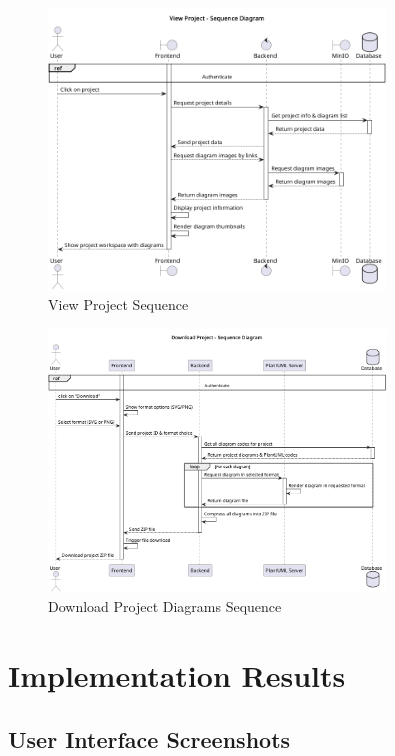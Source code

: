 \begin{figure}[H]
\centering
\includegraphics[width=0.8\textwidth]{conception/SprintIII/sequence_diagrams/sequence_projectManagement_3_2_ViewProjectDetails.png}
\caption{View Project Sequence}
\label{fig:seq_view_project}
\end{figure}

\begin{figure}[H]
\centering
\includegraphics[width=0.8\textwidth]{conception/SprintIII/sequence_diagrams/sequence_projectManagement_3_5_DownloadProjectDiagramsAsZip.png}
\caption{Download Project Diagrams Sequence}
\label{fig:seq_download_project}
\end{figure}

\section{Implementation Results}

\subsection{User Interface Screenshots}

